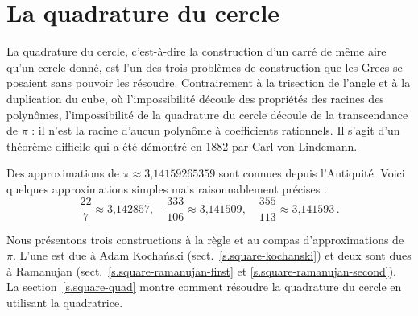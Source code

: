 \chapter{La quadrature du cercle}\label{c.square}




La quadrature du cercle, c'est-à-dire la construction d'un carré de même aire qu'un cercle donné, est l'un des trois problèmes de construction que les Grecs se posaient sans pouvoir les résoudre. Contrairement à la trisection de l'angle et à la duplication du cube, où l'impossibilité découle des propriétés des racines des polynômes, l'impossibilité de la quadrature du cercle découle de la transcendance de $\pi$ : il n'est la racine d'aucun polynôme à coefficients rationnels. Il s'agit d'un théorème difficile qui a été démontré en 1882 par Carl von Lindemann.

Des approximations de $\pi\approx \mbox{3,14159265359}$ sont connues depuis l'Antiquité. Voici quelques approximations simples mais raisonnablement précises :
\[
\displaystyle\frac{22}{7}\approx \mbox{3,142857},\quad \displaystyle\frac{333}{106}\approx \mbox{3,141509},\quad \displaystyle\frac{355}{113}\approx \mbox{3,141593}\,.
\]

Nous présentons trois constructions à la règle et au compas d'approximations de $\pi$. L'une est due à Adam Kocha\'{n}ski (sect.~\ref{s.square-kochanski}) et deux sont dues à Ramanujan (sect.~\ref{s.square-ramanujan-first} et  \ref{s.square-ramanujan-second}). La section~\ref{s.square-quad} montre comment résoudre la quadrature du cercle en utilisant la quadratrice.

\enlargethispage{\baselineskip}

